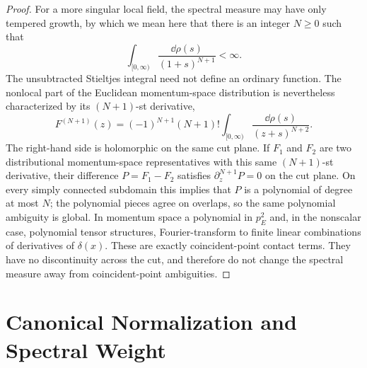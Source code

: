 \begin{proof}
For a more singular local field, the spectral measure may have only tempered
growth, by which we mean here that there is an integer \(N\ge0\) such that
\[
  \int_{[0,\infty)}\frac{\dd\rho(s)}{(1+s)^{N+1}}<\infty .
\]
The unsubtracted Stieltjes integral need not define an ordinary function.  The
nonlocal part of the Euclidean momentum-space distribution is nevertheless
characterized by its \((N+1)\)-st derivative,
\[
  F^{(N+1)}(z)
  =
  (-1)^{N+1}(N+1)!
  \int_{[0,\infty)}\frac{\dd\rho(s)}{(z+s)^{N+2}} .
\]
The right-hand side is holomorphic on the same cut plane.  If \(F_1\) and
\(F_2\) are two distributional momentum-space representatives with this same
\((N+1)\)-st derivative, their difference \(P=F_1-F_2\) satisfies
\(\partial_z^{N+1}P=0\) on the cut plane.  On every simply connected
subdomain this implies that \(P\) is a polynomial of degree at most \(N\);
the polynomial pieces agree on overlaps, so the same polynomial ambiguity is
global.  In momentum space a polynomial in \(p_E^2\) and, in the nonscalar
case, polynomial tensor structures, Fourier-transform to finite linear
combinations of derivatives of \(\delta(x)\).  These are exactly
coincident-point contact terms.  They have no discontinuity across the cut,
and therefore do not change the spectral measure away from coincident-point
ambiguities.
\end{proof}

\section{Canonical Normalization and Spectral Weight}

